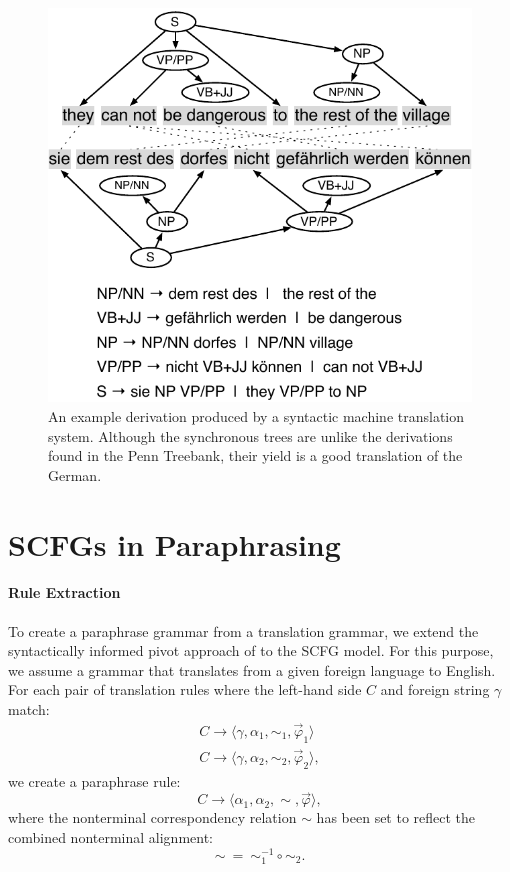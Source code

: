 \documentclass[11pt]{article}
\begin{document}
\begin{figure}[t]
\begin{center}
\includegraphics[width=0.9\linewidth]{figures/example_translation-2a.pdf}
\end{center}
\caption{An example derivation produced by a syntactic machine
  translation system.  Although the synchronous trees are unlike the
  derivations found in the Penn Treebank, their yield is a good
  translation of the German.}
\label{example_translation}
\end{figure}


\section{SCFGs in Paraphrasing} \label{acquisition}


\paragraph{Rule Extraction}

To create a paraphrase grammar from a translation grammar, we extend
the syntactically informed pivot approach of
 to the SCFG model. For this purpose, we
assume a grammar that translates from a given foreign language to
English. For each pair of translation rules where the left-hand side
$C$ and foreign string $\gamma$ match:
\begin{eqnarray*}
  C \rightarrow \langle \gamma, \alpha_1, \sim_1, \vec{\varphi}_1 \rangle \\
  C \rightarrow \langle \gamma, \alpha_2, \sim_2, \vec{\varphi}_2 \rangle ,
\end{eqnarray*}
we create a paraphrase rule:
\begin{equation*}
C \rightarrow \langle \alpha_1, \alpha_2, \sim, \vec{\varphi} \rangle ,
\end{equation*}
where the nonterminal correspondency relation $\sim$ has been set to
reflect the combined nonterminal alignment:
\begin{equation*}
\sim ~ = ~ \sim_1^{-1} \circ \sim_2 .
\end{equation*}
\end{document}
